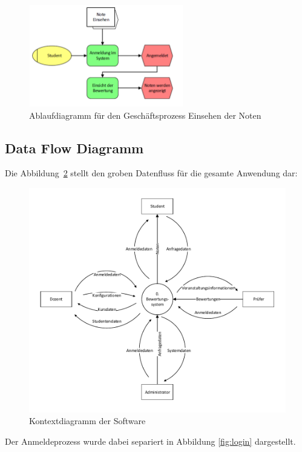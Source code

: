 \begin{appendix}
  	\begin{figure}[th!]
  	\centering
  	\includegraphics[width=0.6\textwidth]{./img/EPK_Einsehen}
  	\caption{Ablaufdiagramm für den Geschäftsprozess Einsehen der Noten}
  	\label{fig:process3}
  	\end{figure}
  
\clearpage
\subsection{Data Flow Diagramm}
  Die Abbildung~\ref{fig:kontextdiagramm} stellt den groben Datenfluss für die gesamte Anwendung dar:
 
 
   \begin{figure}[ht]
 \centering
 \includegraphics[width=\textwidth]{./img/dfd_context}
 \caption{Kontextdiagramm der Software}
 \label{fig:kontextdiagramm}
 \end{figure}
 Der Anmeldeprozess wurde dabei separiert in Abbildung \ref{fig:login} dargestellt.
 

\end{appendix}
